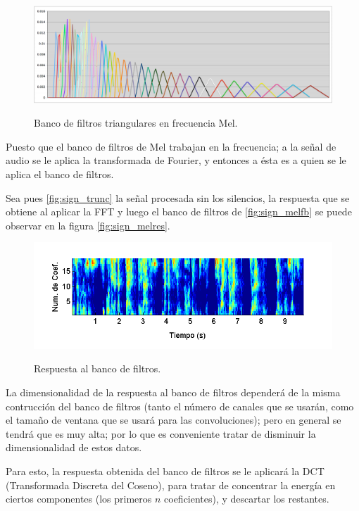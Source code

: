 \begin{figure}[bth]
  \myfloatalign
  {\includegraphics[width=0.9\linewidth]{gfx/chap5/melfb}} \quad
  \caption{Banco de filtros triangulares en frecuencia Mel.}
  \label{fig:sign_melfb}
\end{figure}

Puesto que el banco de filtros de Mel trabajan en la frecuencia; a la señal de audio se le aplica la transformada de Fourier, y entonces a ésta es a quien se le aplica el banco de filtros.

Sea pues \autoref{fig:sign_trunc} la señal procesada sin los silencios, la respuesta que se obtiene al aplicar la FFT y luego el banco de filtros de \autoref{fig:sign_melfb} se puede observar en la figura \autoref{fig:sign_melres}.
\begin{figure}[bth]
  \myfloatalign
  {\includegraphics[width=0.9\linewidth]{gfx/chap5/signal-mel}} \quad
  \caption{Respuesta al banco de filtros.}
  \label{fig:sign_melres}
\end{figure}

La dimensionalidad de la respuesta al banco de filtros dependerá de la misma contrucción del banco de filtros (tanto el número de canales que se usarán, como el tamaño de ventana que se usará para las convoluciones); pero en general se tendrá que es muy alta; por lo que es conveniente tratar de disminuir la dimensionalidad de estos datos.

Para esto, la respuesta obtenida del banco de filtros se le aplicará la DCT (Transformada Discreta del Coseno), para tratar de concentrar la energía en ciertos componentes (los primeros $n$ coeficientes), y descartar los restantes.

